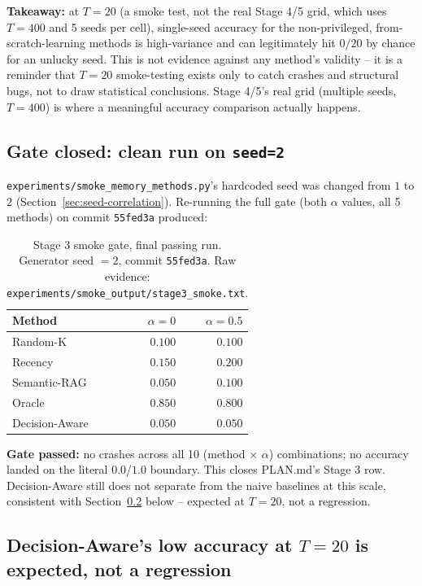 \documentclass[11pt]{article}
\begin{document}
\textbf{Takeaway:} at $T=20$ (a smoke test, not the real Stage 4/5 grid,
which uses $T=400$ and 5 seeds per cell), single-seed accuracy for the
non-privileged, from-scratch-learning methods is high-variance and can
legitimately hit $0/20$ by chance for an unlucky seed. This is not
evidence against any method's validity -- it is a reminder that $T=20$
smoke-testing exists only to catch crashes and structural bugs, not to
draw statistical conclusions. Stage 4/5's real grid (multiple seeds,
$T=400$) is where a meaningful accuracy comparison actually happens.

\subsection{Gate closed: clean run on \texttt{seed=2}}
\label{sec:gate-closed}

\texttt{experiments/smoke\_memory\_methods.py}'s hardcoded seed was
changed from $1$ to $2$ (Section~\ref{sec:seed-correlation}). Re-running
the full gate (both $\alpha$ values, all 5 methods) on commit
\texttt{55fed3a} produced:

\begin{table}[h]
\centering
\begin{tabular}{lrr}
\toprule
Method & $\alpha=0$ & $\alpha=0.5$ \\
\midrule
Random-K       & $0.100$ & $0.100$ \\
Recency        & $0.150$ & $0.200$ \\
Semantic-RAG   & $0.050$ & $0.100$ \\
Oracle         & $0.850$ & $0.800$ \\
Decision-Aware & $0.050$ & $0.050$ \\
\bottomrule
\end{tabular}
\caption{Stage 3 smoke gate, final passing run. Generator seed $=2$,
commit \texttt{55fed3a}. Raw evidence:
\texttt{experiments/smoke\_output/stage3\_smoke.txt}.}
\label{tab:smoke-final}
\end{table}

\textbf{Gate passed:} no crashes across all 10 (method $\times$ $\alpha$)
combinations; no accuracy landed on the literal $0.0$/$1.0$ boundary.
This closes PLAN.md's Stage 3 row. Decision-Aware still does not separate
from the naive baselines at this scale, consistent with
Section~\ref{sec:decision-aware-t20} below -- expected at $T=20$, not a
regression.

\subsection{Decision-Aware's low accuracy at $T=20$ is expected, not a
regression}
\label{sec:decision-aware-t20}
\end{document}
